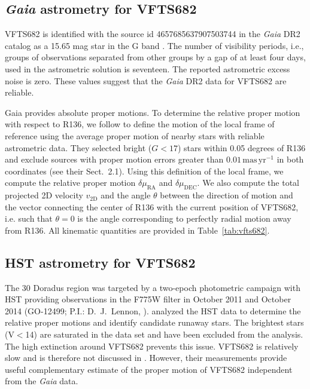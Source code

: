 \documentclass[a4paper,fleqn,usenatbib]{mnras}
\newcommand{\masyr}{\,\mathrm{mas}\,\mathrm{yr}^{-1}}
\DeclareRobustCommand{\Tabref}[1]{Table~\ref{#1}}
\begin{document}
\subsection{ \emph{Gaia} astrometry for VFTS682\label{data:gaia}}


VFTS682 is identified with the source id 4657685637907503744 in the
\emph{Gaia} DR2 catalog %
  as a 15.65 mag star in the G band
\citep{gaia:16,brown:18}.   The number of visibility periods,
i.e., groups of observations separated from other groups by a gap of at
least four days, used in the astrometric solution is seventeen. The reported astrometric excess noise is zero.  These values
suggest that the \emph{Gaia} DR2  data for VFTS682 are
reliable.

Gaia provides absolute proper motions.  To determine the relative
proper motion with respect to R136, we follow  \citet{lennon:18} to
define the motion of the local frame of reference using the average
proper motion of nearby stars with reliable astrometric data.  They
selected bright ($G<17$) stars within 0.05 degrees of R136 and exclude
sources with proper motion errors greater than $0.01\masyr$ in both
coordinates (see their  Sect.~2.1).  Using this definition of the
local frame, we compute the relative proper motion
$\delta\mu_\mathrm{RA}$ and $\delta\mu_\mathrm{DEC}$.   We also compute the total projected 2D velocity
$v_\mathrm{2D}$ and the angle $\theta$ between the direction of motion and the vector
connecting the center of R136 with the current position of VFTS682,
i.e. such that $\theta = 0$ is the angle corresponding to perfectly
radial motion away from R136. All kinematic quantities are provided in
\Tabref{tab:vfts682}. 



\subsection{HST astrometry for VFTS682}

The 30 Doradus region was targeted by a two-epoch photometric campaign with HST providing observations in the F775W filter in October 2011 and October 2014 (GO-12499; P.I.: D.~J.~Lennon, \citealt{sabbi:13}). %
\citet{platais:15, platais:18} analyzed the HST data to determine the
relative proper motions and identify candidate runaway stars. The
brightest stars (V$<$14) are saturated in the data set and have been
excluded from the analysis. The high extinction around VFTS682
prevents this issue. %
VFTS682 is relatively slow and is therefore not discussed in
\citealt{platais:18}.  However, their measurements provide useful
complementary estimate of the proper motion of VFTS682 independent from the \emph{Gaia} data. 
 
\end{document}
